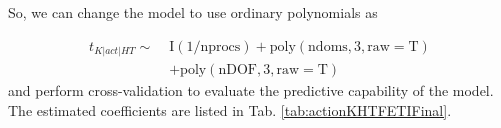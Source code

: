 
So, we can change the model to use ordinary polynomials as 

\begin{equation}
\label{eq:actionKHTFETIFfinal}
\begin{aligned}
t_{K|act|HT} \sim\; &\mathrm{I(1/nprocs) + poly(ndoms, 3, raw=T)}\\
&+ \mathrm{poly(nDOF, 3, raw=T)}
\end{aligned}
\end{equation}
and perform cross-validation to evaluate the predictive capability of the model. The estimated coefficients are listed in Tab. \ref{tab:actionKHTFETIFinal}.

